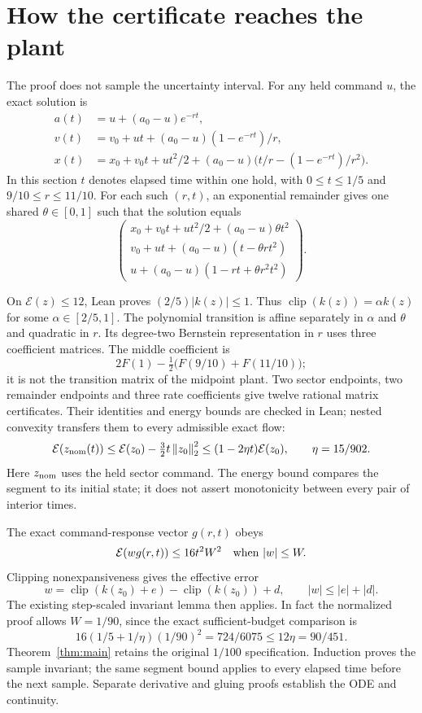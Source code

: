 \documentclass[10pt]{article}
\newcommand{\E}{\mathcal E}
\newcommand{\clip}{\operatorname{clip}}
\newcommand{\norm}[1]{\left\lVert#1\right\rVert}
\begin{document}
\section{How the certificate reaches the plant}
The proof does not sample the uncertainty interval. For any held command $u$,
the exact solution is
\begin{align*}
 a(t)&=u+(a_0-u)e^{-rt},\\
 v(t)&=v_0+ut+(a_0-u)(1-e^{-rt})/r,\\
 x(t)&=x_0+v_0t+ut^2/2+(a_0-u)\bigl(t/r-(1-e^{-rt})/r^2\bigr).
\end{align*}
In this section $t$ denotes elapsed time within one hold, with $0\le t\le1/5$
and $9/10\le r\le11/10$. For each such $(r,t)$, an exponential remainder gives one shared
$\theta\in[0,1]$ such that the solution equals
\begin{equation}\label{eq:poly}
 \begin{pmatrix}
 x_0+v_0t+ut^2/2+(a_0-u)\theta t^2\\
 v_0+ut+(a_0-u)(t-\theta rt^2)\\
 u+(a_0-u)(1-rt+\theta r^2t^2)
 \end{pmatrix}.
\end{equation}

On $\E(z)\le12$, Lean proves $(2/5)|k(z)|\le1$.
Thus $\clip(k(z))=\alpha k(z)$ for some $\alpha\in[2/5,1]$.
The polynomial transition is affine separately in $\alpha$ and $\theta$ and quadratic in $r$.
Its degree-two Bernstein representation in $r$ uses three coefficient matrices.
The middle coefficient is
\[
 2F(1)-\tfrac12\bigl(F(9/10)+F(11/10)\bigr);
\]
it is not the transition matrix of the midpoint plant.
Two sector endpoints, two remainder endpoints and three rate coefficients give
twelve rational matrix certificates. Their identities and energy bounds are
checked in Lean; nested convexity transfers them to every admissible exact flow:
\[
 \E(z_{\rm nom}(t))\le\E(z_0)-\tfrac32t\norm{z_0}_2^2
 \le(1-2\eta t)\E(z_0),\qquad \eta=15/902.
\]
Here $z_{\rm nom}$ uses the held sector command. The energy bound compares the
segment to its initial state; it does not assert monotonicity between every
pair of interior times.

The exact command-response vector $g(r,t)$ obeys
\[
 \E(wg(r,t))\le16t^2W^2\quad\hbox{when }|w|\le W.
\]
Clipping nonexpansiveness gives the effective error
\[
 w=\clip(k(z_0)+e)-\clip(k(z_0))+d,\qquad |w|\le|e|+|d|.
\]
The existing step-scaled invariant lemma then applies. In fact the normalized
proof allows $W=1/90$, since the exact sufficient-budget comparison is
\[
 16(1/5+1/\eta)(1/90)^2=724/6075
 \le12\eta=90/451.
\]
Theorem~\ref{thm:main} retains the original $1/100$ specification.
Induction proves the sample invariant; the same segment bound applies to every
elapsed time before the next sample. Separate derivative and gluing proofs
establish the ODE and continuity.
\end{document}
